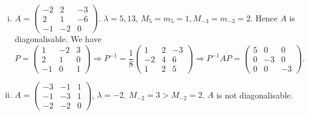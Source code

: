 \documentclass[10pt]{article}
\begin{document}
    \begin{example}
        \begin{enumerate}[(i)]
            \item $A=\begin{pmatrix}
                -2 & 2 & -3 \\
                2 & 1 & -6 \\
                -1 & -2 & 0
            \end{pmatrix}$. $ \lambda=5,13 $, $ M_5=m_5=1, M_{-3}=m_{-3}=2 $. Hence $A$ is diagonalisable. We have
            \[
                P=\begin{pmatrix}
                    1&-2&3\\
                    2&1&0\\
                    -1&0&1
                \end{pmatrix} \Longrightarrow P^{-1}=\frac{1}{8}\begin{pmatrix}
                    1&2&-3\\
                    -2&4&6\\
                    1&2&5
                \end{pmatrix}\Longrightarrow 
                P^{-1}AP=\begin{pmatrix}
                    5&0&0\\
                    0&-3&0\\
                    0&0&-3
                \end{pmatrix}
            .\]
            \item $ A=\begin{pmatrix}
                -3&-1&1\\
                -1&-3&1\\
                -2&-2&0
            \end{pmatrix}$, $ \lambda=-2 $. $ M_{-2}=3>M_{-2}=2 $. $A$ is not diagonalisable.
        \end{enumerate}
    \end{example}
\end{document}
